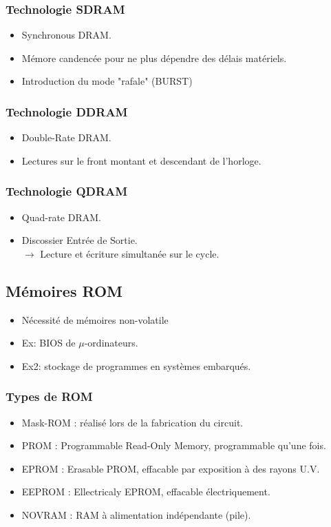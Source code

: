 \documentclass[10pt]{article}
\begin{document}
\begin{multicols}{2}
  \subsubsection{Technologie SDRAM}
  \begin{itemize}
    \itemsep0em
    \item Synchronous DRAM.
    \item Mémore candencée pour ne plus dépendre des délais matériels.
    \item Introduction du mode "rafale" (BURST)
  \end{itemize}
  \subsubsection{Technologie DDRAM}
  \begin{itemize}
    \itemsep0em
    \item Double-Rate DRAM.
    \item Lectures sur le front montant et descendant de l'horloge.
  \end{itemize}
  \subsubsection{Technologie QDRAM}
  \begin{itemize}
    \itemsep0em
    \item Quad-rate DRAM.
    \item Discossier Entrée de Sortie.\\
    $\rightarrow$ Lecture et écriture simultanée sur le cycle.
  \end{itemize}
  \subsection{Mémoires ROM}
  \begin{itemize}
    \itemsep0em
    \item Nécessité de mémoires non-volatile
    \item Ex: BIOS de $\mu$-ordinateurs.
    \item Ex2: stockage de programmes en systèmes embarqués.
  \end{itemize}
  \subsubsection{Types de ROM}
  \begin{itemize}
    \item Mask-ROM : réalisé lors de la fabrication du circuit.
    \item PROM : Programmable Read-Only Memory, programmable qu'une fois.
    \item EPROM : Erasable PROM, effacable par exposition à des rayons U.V.
    \item EEPROM : Ellectricaly EPROM, effacable électriquement.
    \item NOVRAM : RAM à alimentation indépendante (pile).
  \end{itemize}

\end{multicols}
\end{document}
